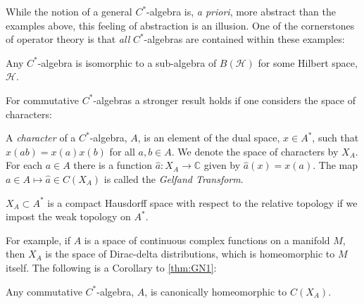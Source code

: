 \documentclass[final,leqno]{siamart}
\begin{document}
While the notion of a general $C^{*}$-algebra is, \textit{a priori}, more abstract than the examples above, this feeling of abstraction is an illusion.
One of the cornerstones of operator theory is that \emph{all} $C^{*}$-algebras are contained within these examples:

\begin{theorem} \label{thm:GN1}
	Any $C^{*}$-algebra is isomorphic to a sub-algebra of $B(\mathcal{H})$ for some Hilbert space, $\mathcal{H}$.
\end{theorem}

For commutative $C^{*}$-algebras a stronger result holds if one considers the space of characters:
\begin{definition}
	A \emph{character} of a $C^{*}$-algebra, $A$, is an element of the dual space, $x \in A^{*}$, such that $x(ab) = x(a) x(b)$ for all $a,b \in A$.  
	We denote the space of characters by $X_{A}$.
	For each $a \in A$ there is a function $\hat{a}: X_{A} \to \mathbb{C}$ given by $\hat{a}(x) = x(a)$.
	The map $a \in A \mapsto \hat{a} \in C(X_{A})$ is called the \emph{Gelfand Transform}.
\end{definition}

\begin{proposition}
	$X_{A} \subset A^{*}$ is a compact Hausdorff space with respect to the relative topology if we impost the weak topology on $A^{*}$.
\end{proposition}

For example, if $A$ is a space of continuous complex functions on a manifold $M$, then $X_{A}$ is the space of Dirac-delta distributions, which is homeomorphic to $M$ itself.
The following is a Corollary to \ref{thm:GN1}:

\begin{theorem} \label{thm:GN2}
	Any commutative $C^{*}$-algebra, $A$, is canonically homeomorphic to $C(X_{A} )$.
\end{theorem}
\end{document}
